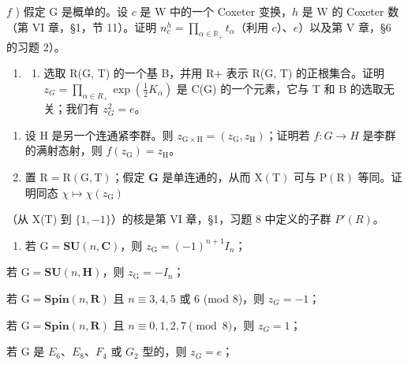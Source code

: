 \(f\) ) 假定 \(\mathrm{G}\) 是概单的。设 \(c\) 是 \(\mathrm{W}\) 中的一个 Coxeter 变换，\(h\) 是 \(\mathrm{W}\) 的 Coxeter 数（第 VI 章，§1，节 11）。证明 \(n_c^h = \prod_{\alpha \in \mathbb{R}_+}t_\alpha\)（利用 \(c\)）、\(e\)）以及第 V 章，§6 的习题 2）。

\begin{enumerate}
\def\labelenumi{\arabic{enumi})}
\setcounter{enumi}{12}
\tightlist
\item
  \begin{enumerate}
  \def\labelenumii{\alph{enumii})}
  \tightlist
  \item
    选取 R(G, T) 的一个基 B，并用 R+ 表示 R(G, T) 的正根集合。证明 \(z_{G} = \prod_{\alpha \in R_{+}} \exp(\frac{1}{2} K_{\alpha})\) 是 C(G) 的一个元素，它与 T 和 B 的选取无关；我们有 \(z_{G}^{2} = e\)。
  \end{enumerate}
\end{enumerate}

\begin{enumerate}
\def\labelenumi{\alph{enumi})}
\setcounter{enumi}{1}
\item
  设 H 是另一个连通紧李群。则 \(z_{\mathrm{G}\times\mathrm{H}} = (z_{\mathrm{G}}, z_{\mathrm{H}})\)；证明若 \(f : G \to H\) 是李群的满射态射，则 \(f(z_{\mathrm{G}}) = z_{\mathrm{H}}\)。
\item
  置 \(\mathrm{R} = \mathrm{R}(\mathrm{G},\mathrm{T})\)；假定 \(\mathbf{G}\) 是单连通的，从而 \(\mathrm{X(T)}\) 可与 \(\mathrm{P(R)}\) 等同。证明同态 \(\chi \mapsto \chi (z_{\mathrm{G}})\)
\end{enumerate}

（从 X(T) 到 \(\{1,-1\}\)）的核是第 VI 章，§1，习题 8 中定义的子群 \(P'(R)\)。

\begin{enumerate}
\def\labelenumi{\alph{enumi})}
\setcounter{enumi}{3}
\tightlist
\item
  若 \(\mathrm{G} = \mathbf{S}\mathbf{U}(n,\mathbf{C})\)，则 \(z_{\mathrm{G}} = (-1)^{n + 1}I_n\)；
\end{enumerate}

若 \(\mathrm{G} = \mathbf{S}\mathbf{U}(n,\mathbf{H})\)，则 \(z_{\mathrm{G}} = -I_n\)；

若 \(\mathrm{G} = \mathbf{Spin}(n, \mathbf{R})\) 且 \(n \equiv 3, 4, 5\) 或 6 (mod 8)，则 \(z_{G} = -1\)；

若 \(\mathrm{G} = \mathbf{Spin}(n, \mathbf{R})\) 且 \(n \equiv 0, 1, 2, 7 \pmod{8}\)，则 \(z_{G} = 1\)；

若 G 是 \(E_{6}\)、\(E_{8}\)、\(F_{4}\) 或 \(G_{2}\) 型的，则 \(z_{G} = e\)；

